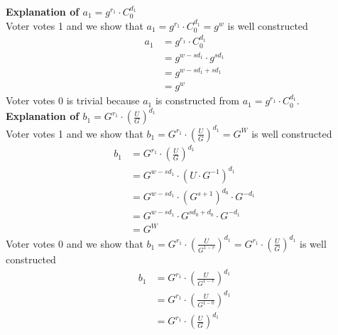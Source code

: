 \noindent
\textbf{Explanation of \begin{math}a_1=g^{r_1}  \cdot  C^{d_1}_0\end{math}}\\

\noindent
Voter votes 1 and we show that \begin{math}a_1=g^{r_1}  \cdot  C^{d_1}_0 = g^w \end{math} is well constructed
\begin{align*}
    a_1 &= g^{r_1}  \cdot  C^{d_1}_0    \\
        &= g^{w-sd_1} \cdot  g^{sd_1}   \\
        &= g^{w-sd_1+ sd_1}             \\
        &= g^w
\end{align*}
Voter votes 0 is trivial because \begin{math}a_1 \end{math} is constructed from \begin{math}a_1=g^{r_1}  \cdot  C^{d_1}_0 \end{math}.\\


\noindent
\textbf{Explanation of \begin{math}b_1= G^{r_1}  \cdot (\frac{U}{G})^{d_1}\end{math}}\\

\noindent
Voter votes 1 and we show that \begin{math}b_1= G^{r_1}  \cdot (\frac{U}{G})^{d_1} = G^W\end{math} is well constructed \begin{align*}
    b_1 &= G^{r_1}  \cdot (\frac{U}{G})^{d_1}                   \\
        &= G^{w-sd_1} \cdot (U \cdot G^{-1})^{d_1}              \\
        &= G^{w-sd_1} \cdot  (G^{s+1})^{d_0} \cdot G^{-d_1}     \\
        &= G^{w-sd_1} \cdot  G^{sd_0+d_0} \cdot G^{-d_1}        \\
        &= G^W
\end{align*}
Voter votes 0 and we show that  \begin{math}b_1= G^{r_1}  \cdot (\frac{U}{G^{1-v}})^{d_1} = G^{r_1}  \cdot (\frac{U}{G})^{d_1}\end{math} is well constructed
\begin{align*}
    b_1 &= G^{r_1}  \cdot (\frac{U}{G^{1-v}})^{d_1}             \\ 
        &= G^{r_1}  \cdot (\frac{U}{G^{1-0}})^{d_1}             \\
        &= G^{r_1}  \cdot (\frac{U}{G})^{d_1}
\end{align*}





